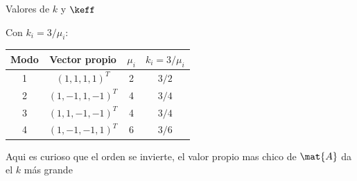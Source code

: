 %

Valores de $k$ y $\keff$

Con $k_i = 3/\mu_i$:
\begin{center}
	\begin{tabular}{|c|c|c|c|}
		\hline
		Modo & Vector propio & $\mu_i$ & $k_i = 3/\mu_i$\\
		\hline
		1 & $(1, 1, 1, 1)^T$   & 2 & $3/2 $\\
		2 & $(1, -1, 1, -1)^T$ & 4 & $3/4 $\\
		3 & $(1, 1, -1, -1)^T$ & 4 & $3/4 $\\
		4 & $(1, -1, -1, 1)^T$ & 6 & $3/6 $\\
		\hline
	\end{tabular}
\end{center}
Aqui es curioso que el orden se invierte, el valor propio mas chico de $\mat{A}$ da el $k$ más grande


